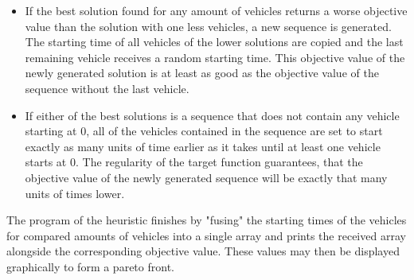 \begin{itemize}
  \item If the best solution found for any amount of vehicles returns a worse objective value than the solution with one less vehicles, a new sequence
    is generated. The starting time of all vehicles of the lower solutions are copied and the last remaining vehicle receives a random starting time.
    This objective value of the newly generated solution is at least as good as the objective value of the sequence without the last vehicle.
  \item If either of the best solutions is a sequence that does not contain any vehicle starting at 0, all of the vehicles contained in the sequence
    are set to start exactly as many units of time earlier as it takes until at least one vehicle starts at 0. The regularity of the target function
    guarantees, that the objective value of the newly generated sequence will be exactly that many units of times lower.
\end{itemize}

The program of the heuristic finishes by "fusing" the starting times of the vehicles for compared amounts of vehicles into a single array and prints
the received array alongside the corresponding objective value. These values may then be displayed graphically to form a pareto front.